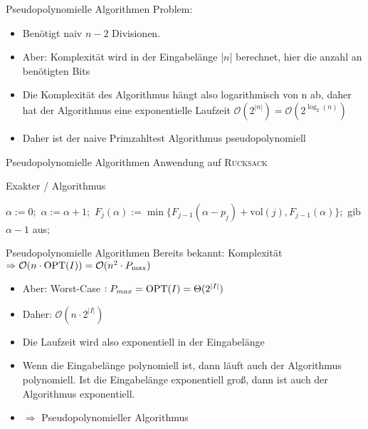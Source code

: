 \begin{frame}{Pseudopolynomielle Algorithmen}
Problem:

\begin{itemize}
\item
Benötigt naiv $n-2$ Divisionen.
\item
Aber: Komplexität wird in der Eingabelänge |$n$| berechnet, hier die anzahl an benötigten Bits
\item
Die Komplexität des Algorithmus hängt also logarithmisch von n ab, daher hat der Algorithmus eine exponentielle Laufzeit $\mathcal{O}(2^{|n|}) = \mathcal{O}(2^{\log_2{(n)}})$
\item Daher ist der naive Primzahltest Algorithmus pseudopolynomiell

\end{itemize}
\end{frame}

\begin{frame}{Pseudopolynomielle Algorithmen}
Anwendung auf \textsc{Rucksack}
\newline

\begin{algorithm}[H]
    \caption{Exakter \rucksack/ Algorithmus}
        \begin{algorithmic}
            \State $\alpha:=0;$
            \Repeat
            \State $\alpha:=\alpha+1;$
            \State $F_j(\alpha):=\min\{F_{j-1}(\alpha-p_j)+\text{vol}(j),F_{j-1}(\alpha)\};$
            \EndFor
            \State gib $\alpha-1$ aus$;$
        \end{algorithmic}
\end{algorithm}

\end{frame}

\begin{frame}{Pseudopolynomielle Algorithmen}
Bereits bekannt: Komplexität $\Rightarrow \mathcal{O}( n \cdot \operatorname{OPT}(I)) = \mathcal{O}( n^2 \cdot P_{\max})$ 
\begin{itemize}
	\item
	Aber: Worst-Case $: P_{max} = \operatorname{OPT}(I) = \Theta(2^{|I|})$
	\item
	Daher: 
	$\mathcal{O}(n\cdot 2^{|I|})$
	\item
	Die Laufzeit wird also exponentiell in der Eingabelänge
	\item
	Wenn die Eingabelänge polynomiell ist, dann läuft auch der Algorithmus polynomiell. Ist die Eingabelänge exponentiell groß, dann ist auch der Algorithmus exponentiell.
	\item
	$\Rightarrow$ Pseudopolynomieller Algorithmus


\end{itemize}

\end{frame}

